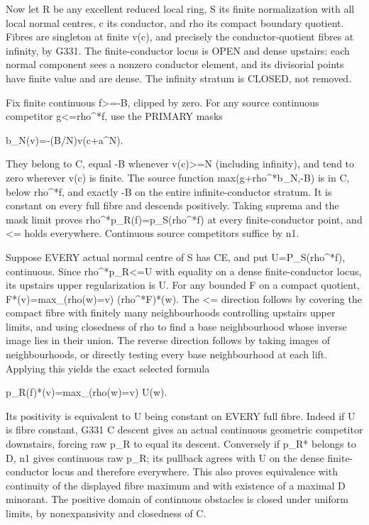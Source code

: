 \documentclass[11pt]{article}
\begin{document}
Now let R be any excellent reduced local ring, S its finite normalization with all local normal centres, c its conductor, and rho its compact boundary quotient. Fibres are singleton at finite v(c), and precisely the conductor-quotient fibres at infinity, by G331. The finite-conductor locus is OPEN and dense upstairs: each normal component sees a nonzero conductor element, and its divisorial points have finite value and are dense. The infinity stratum is CLOSED, not removed.

Fix finite continuous f>=-B, clipped by zero. For any source continuous competitor g<=rho\textasciicircum{}*f, use the PRIMARY masks

b\_N(v)=-(B/N)v(c+a\textasciicircum{}N).

They belong to C, equal -B whenever v(c)>=N (including infinity), and tend to zero wherever v(c) is finite. The source function max(g+rho\textasciicircum{}*b\_N,-B) is in C, below rho\textasciicircum{}*f, and exactly -B on the entire infinite-conductor stratum. It is constant on every full fibre and descends positively. Taking suprema and the mask limit proves rho\textasciicircum{}*p\_R(f)=p\_S(rho\textasciicircum{}*f) at every finite-conductor point, and <= holds everywhere. Continuous source competitors suffice by n1.

Suppose EVERY actual normal centre of S has CE, and put U=P\_S(rho\textasciicircum{}*f), continuous. Since rho\textasciicircum{}*p\_R<=U with equality on a dense finite-conductor locus, its upstairs upper regularization is U. For any bounded F on a compact quotient, F*(v)=max\_(rho(w)=v) (rho\textasciicircum{}*F)*(w). The <= direction follows by covering the compact fibre with finitely many neighbourhoods controlling upstairs upper limits, and using closedness of rho to find a base neighbourhood whose inverse image lies in their union. The reverse direction follows by taking images of neighbourhoods, or directly testing every base neighbourhood at each lift. Applying this yields the exact selected formula

p\_R(f)*(v)=max\_(rho(w)=v) U(w).

Its positivity is equivalent to U being constant on EVERY full fibre. Indeed if U is fibre constant, G331 C descent gives an actual continuous geometric competitor downstairs, forcing raw p\_R to equal its descent. Conversely if p\_R* belongs to D, n1 gives continuous raw p\_R; its pullback agrees with U on the dense finite-conductor locus and therefore everywhere. This also proves equivalence with continuity of the displayed fibre maximum and with existence of a maximal D minorant. The positive domain of continuous obstacles is closed under uniform limits, by nonexpansivity and closedness of C.
\end{document}
